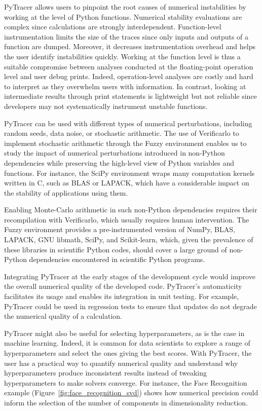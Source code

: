 \documentclass[10pt,journal,compsoc]{IEEEtran}
\newcommand{\pytracer}[0]{PyTracer\xspace}
\DeclareRobustCommand{\add}[1]{\textcolor{ao(english)}{#1}}%
\DeclareRobustCommand{\add}[1]{#1}
\begin{document}
\pytracer allows users to pinpoint the root causes of numerical instabilities by
working at the level of Python functions. Numerical stability evaluations are complex since
calculations are strongly interdependent. Function-level instrumentation limits
the size of the traces since only inputs and outputs of a function are dumped.
Moreover, it decreases instrumentation overhead and helps the user identify
instabilities quickly. Working at the function level is thus a suitable
compromise between analyses conducted at the floating-point operation level and
user debug prints. Indeed, operation-level analyses are costly and hard to
interpret as they overwhelm users with information. In contrast, looking at
intermediate results through print statements is lightweight but not reliable
since developers may not systematically instrument unstable functions. 

\add{\pytracer can be used with different types of numerical perturbations,
    including random seeds, data noise, or stochastic arithmetic. The
    use of Verificarlo to implement stochastic arithmetic through the Fuzzy
    environment enables us to study the impact of numerical perturbations
    introduced in non-Python dependencies while preserving the high-level view
    of Python variables and functions. For instance, the SciPy environment
    wraps many computation kernels written in C, such as BLAS or LAPACK, which
    have a considerable impact on the stability of applications using them.}

\add{
    Enabling Monte-Carlo arithmetic in such non-Python dependencies requires
    their recompilation with Verificarlo, which usually requires human
    intervention. The Fuzzy environment provides a pre-instrumented version of
    NumPy, BLAS, LAPACK, GNU libmath, SciPy, and Scikit-learn, which, given the
    prevalence of these libraries in scientific Python codes, should cover a
    large ground of non-Python dependencies encountered in scientific Python programs.
}


Integrating \pytracer at the early stages of the development cycle would improve
the overall numerical quality of the developed code. \pytracer's automaticity
facilitates its usage and enables its integration in unit testing. For example,
\pytracer could be used in regression tests to ensure that updates do not
degrade the numerical quality of a calculation. 

\pytracer might also be useful for selecting hyperparameters, as is the case in
machine learning. Indeed, it is common for data scientists to explore a range of
hyperparameters and select the ones giving the best scores. With \pytracer, the
user has a practical way to quantify numerical quality and understand why
hyperparameters produce inconsistent results instead of tweaking hyperparameters
to make solvers converge. For instance, the Face Recognition example
(Figure~\ref{fig:face_recognition_svd}) shows how numerical precision could
inform the selection of the number of components in dimensionality reduction. 
\end{document}

